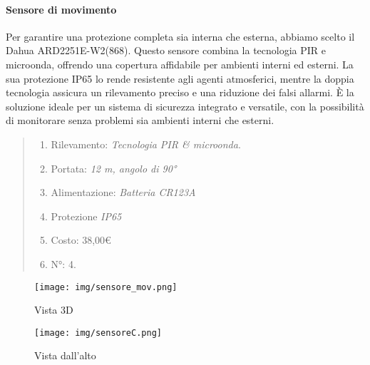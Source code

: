 \documentclass[italian, 12pt, a4paper]{article}
\begin{document}
\paragraph{Sensore di movimento}
Per garantire una protezione completa sia interna che esterna, abbiamo scelto il Dahua ARD2251E-W2(868). Questo sensore combina la tecnologia PIR e microonda, offrendo una copertura affidabile per ambienti interni ed esterni. La sua protezione IP65 lo rende resistente agli agenti atmosferici, mentre la doppia tecnologia assicura un rilevamento preciso e una riduzione dei falsi allarmi. È la soluzione ideale per un sistema di sicurezza integrato e versatile, con la possibilità di monitorare senza problemi sia ambienti interni che esterni.
\begin{quote}
    \begin{enumerate}
        \item Rilevamento: \emph{Tecnologia PIR \& microonda}.
        \item Portata: \emph{12 m, angolo di 90°}
        \item Alimentazione: \emph{Batteria CR123A}
        \item Protezione \emph{IP65}
        \item Costo: 38,00€
        \item N°: 4.
    \end{enumerate}
\end{quote}
\begin{figure}[h]
    \centering
    \begin{minipage}{0.45\textwidth}
        \centering
        \texttt{[image: img/sensore\_mov.png]}
        \caption{Vista 3D}
    \end{minipage} \hfill
    \begin{minipage}{0.45\textwidth}
        \centering
        \texttt{[image: img/sensoreC.png]}
        \caption{Vista dall'alto}
    \end{minipage}
\end{figure}
\end{document}
